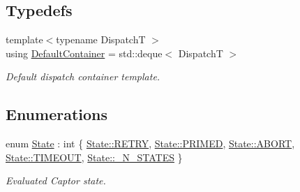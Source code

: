 \subsection*{Typedefs}
\begin{DoxyCompactItemize}
\item 
\mbox{\label{namespaceflow_ae5be95d6aaac2a27a1504e60657ad00d}} 
{\footnotesize template$<$typename DispatchT $>$ }\\using \hyperlink{namespaceflow_ae5be95d6aaac2a27a1504e60657ad00d}{Default\+Container} = std\+::deque$<$ DispatchT $>$
\begin{DoxyCompactList}\small\item\em Default dispatch container template. \end{DoxyCompactList}\end{DoxyCompactItemize}
\subsection*{Enumerations}
\begin{DoxyCompactItemize}
\item 
enum \hyperlink{namespaceflow_adefe9726e597eb50c46f0f6a202018e9}{State} \+: int \{ \newline
\hyperlink{namespaceflow_adefe9726e597eb50c46f0f6a202018e9ac0cc02c3b3d55abb7bfb49ddbb4866c8}{State\+::\+R\+E\+T\+RY}, 
\hyperlink{namespaceflow_adefe9726e597eb50c46f0f6a202018e9a6eed4968877959d0209d9b75fdd16b52}{State\+::\+P\+R\+I\+M\+ED}, 
\hyperlink{namespaceflow_adefe9726e597eb50c46f0f6a202018e9a8d12a2ca7e5a64036d7251a3eda51a38}{State\+::\+A\+B\+O\+RT}, 
\hyperlink{namespaceflow_adefe9726e597eb50c46f0f6a202018e9a070a0fb40f6c308ab544b227660aadff}{State\+::\+T\+I\+M\+E\+O\+UT}, 
\newline
\hyperlink{namespaceflow_adefe9726e597eb50c46f0f6a202018e9a63b87258ef5b5f3ccdfd68f9e673d66d}{State\+::\+\_\+\+N\+\_\+\+S\+T\+A\+T\+ES}
 \}\begin{DoxyCompactList}\small\item\em Evaluated Captor state. \end{DoxyCompactList}
\end{DoxyCompactItemize}
